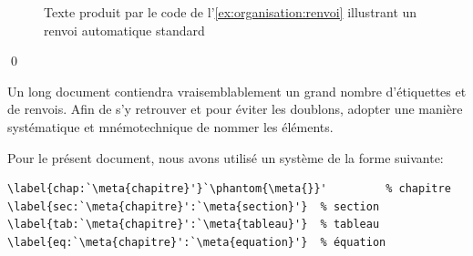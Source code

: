 \begin{exemple}
  \begin{figure}
    \caption{Texte produit par le code de
      l'\autoref{ex:organisation:renvoi} illustrant un renvoi
      automatique standard}
    \label{fig:organisation:renvoi}
  \end{figure}
  \qed
\end{exemple}

\begin{conseil}
  Un long document contiendra vraisemblablement un grand nombre
  d'étiquettes et de renvois. Afin de s'y retrouver et pour éviter les
  doublons, adopter une manière systématique et mnémotechnique de
  nommer les éléments.

  Pour le présent document, nous avons utilisé un système de la forme
  suivante:
\begin{lstlisting}
\label{chap:`\meta{chapitre}'}`\phantom{\meta{}}'         % chapitre
\label{sec:`\meta{chapitre}':`\meta{section}'}  % section
\label{tab:`\meta{chapitre}':`\meta{tableau}'}  % tableau
\label{eq:`\meta{chapitre}':`\meta{equation}'}  % équation
\end{lstlisting}
\end{conseil}

